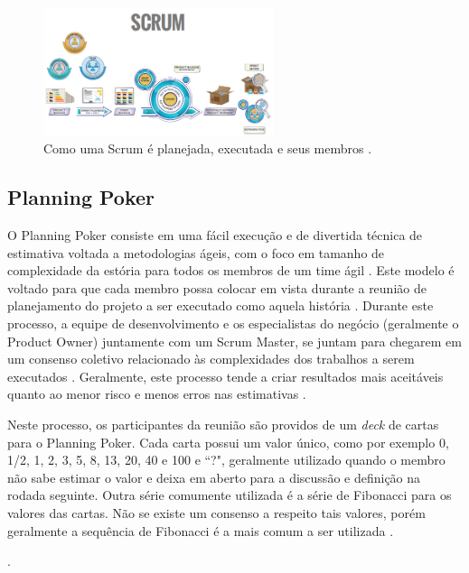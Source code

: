 \begin{figure}
    \centering
    \includegraphics[width=0.6\textwidth]{img/Imagem Scrum Primer.png}
    \caption{Como uma Scrum é planejada, executada e seus membros \cite{primer}.}
    \label{fig:scrum}
\end{figure}

\subsection{Planning Poker}

O Planning Poker consiste em uma fácil execução e de divertida técnica de estimativa voltada a metodologias ágeis, com o foco em tamanho de complexidade da estória para todos os membros de um time ágil \cite{planningpoker,usingfunctionpoints,storyestimation}. Este modelo é voltado para que cada membro possa colocar em vista durante a reunião de planejamento do projeto a ser executado como aquela história \cite{Scrum}. Durante este processo, a equipe de desenvolvimento e os especialistas do negócio (geralmente o Product Owner) juntamente com um Scrum Master, se juntam para chegarem em um consenso coletivo relacionado às complexidades dos trabalhos a serem executados \cite{techplanningpoker}. Geralmente, este processo tende a criar resultados mais aceitáveis quanto ao menor risco e menos erros nas estimativas \cite{usingplanningpoker2}.

Neste processo, os participantes da reunião são providos de um \textit{deck} de cartas para o Planning Poker. Cada carta possui um valor único, como por exemplo 0, 1/2, 1, 2, 3, 5, 8, 13, 20, 40 e 100 e ``?", geralmente utilizado quando o membro não sabe estimar o valor e deixa em aberto para a discussão e definição na rodada seguinte. Outra série comumente utilizada é a série de Fibonacci para os valores das cartas. Não se existe um consenso a respeito tais valores, porém geralmente a sequência de Fibonacci é a mais comum a ser utilizada \cite{evaluatingplanningpoker}.

.

